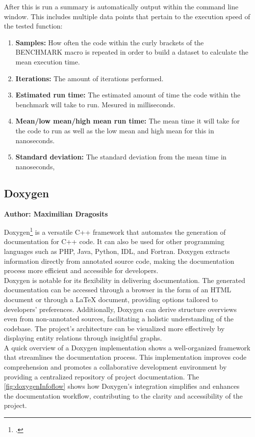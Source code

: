 After this is run a summary is automatically output within the command line window. This includes multiple data points that pertain to the execution speed of the tested
function:
\begin{enumerate}
    \item \textbf{Samples:} How often the code within the curly brackets of the BENCHMARK macro is repeated in order to build a dataset to calculate the mean execution time.
    \item \textbf{Iterations:} The amount of iterations performed.
    \item \textbf{Estimated run time:} The estimated amount of time the code within the benchmark will take to run. Mesured in milliseconds.
    \item \textbf{Mean/low mean/high mean run time:} The mean time it will take for the code to run as well as the low mean and high mean for this in nanoseconds.
    \item \textbf{Standard deviation:} The standard deviation from the mean time in nanoseconds,
\end{enumerate}

\subsection{Doxygen}
\textbf{Author: Maximilian Dragosits}

Doxygen\footcite{doxygen_main_site} is a versatile C++ framework that automates the generation of documentation for C++ code. It can also be used for other programming languages such as 
PHP, Java, Python, IDL, and Fortran. Doxygen extracts information directly from annotated source code, making the documentation process more efficient and 
accessible for developers.\\

Doxygen is notable for its flexibility in delivering documentation. The generated documentation can be accessed through a browser in the form of an HTML document or  
through a LaTeX document, providing options tailored to developers' preferences. Additionally, Doxygen can derive structure overviews even from non-annotated 
sources, facilitating a holistic understanding of the codebase. The project's architecture can be visualized more effectively by displaying entity relations 
through insightful graphs.\\

A quick overview of a Doxygen implementation shows a well-organized framework that streamlines the documentation process. This implementation improves code 
comprehension and promotes a collaborative development environment by providing a centralized repository of project documentation. The \ref{fig:doxygenInfoflow} shows how Doxygen's 
integration simplifies and enhances the documentation workflow, contributing to the clarity and accessibility of the project.\\

